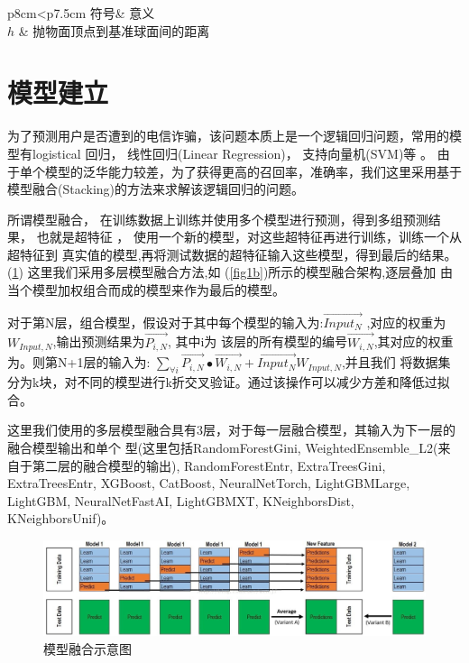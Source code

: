 \documentclass[withoutpreface,bwprint]{cumcmthesis} %
\begin{document}
        \begin{longtable}{p{8cm}<{\centering}p{7.5cm}}
            \toprule  %
            符号& 意义\\
            \midrule  %
            $h$ & 抛物面顶点到基准球面间的距离  \\
            \bottomrule %
        \end{longtable}

        \newpage


        \section{模型建立}

为了预测用户是否遭到的电信诈骗，该问题本质上是一个逻辑回归问题，常用的模型有logistical 回归，
线性回归(Linear Regression)， 支持向量机(SVM)等 。
由于单个模型的泛华能力较差，为了获得更高的召回率，准确率，我们这里采用基于
模型融合(Stacking)的方法来求解该逻辑回归的问题。

     所谓模型融合， 在训练数据上训练并使用多个模型进行预测，得到多组预测结果，
     也就是超特征 ，  使用一个新的模型，对这些超特征再进行训练，训练一个从超特征到
     真实值的模型,再将测试数据的超特征输入这些模型，得到最后的结果。   (\ref{fig1a})
     这里我们采用多层模型融合方法,如 (\ref{fig1b})所示的模型融合架构,逐层叠加
     由当个模型加权组合而成的模型来作为最后的模型。

    对于第N层，组合模型，假设对于其中每个模型的输入为:$\vec{Input_{N}}$ ,对应的权重为$W_{Input ,N}$,输出预测结果为$\vec{P_{i,N}}$, 其中i为
    该层的所有模型的编号$\vec{W_{i,N}}$,其对应的权重为。则第N+1层的输入为:
    $ \sum_{\forall i } \vec{P_{i,N}}\bullet \vec{W_{i,N}} +\vec{Input_{N}}W_{Input ,N} $,并且我们
    将数据集分为k块，对不同的模型进行k折交叉验证。通过该操作可以减少方差和降低过拟合。
  
   这里我们使用的多层模型融合具有3层，对于每一层融合模型，其输入为下一层的融合模型输出和单个
   型(这里包括RandomForestGini, WeightedEnsemble\_L2(来自于第二层的融合模型的输出), RandomForestEntr,
   ExtraTreesGini, ExtraTreesEntr, XGBoost, CatBoost,
   NeuralNetTorch, LightGBMLarge, LightGBM, NeuralNetFastAI,
   LightGBMXT, KNeighborsDist, KNeighborsUnif)。
    
     \begin{figure}[H]
        \begin{minipage}[t]{0.5\linewidth}
        
            \centering
            \includegraphics[scale=0.3]{images/moxing.png}
            \caption{模型融合示意图}
            \label{fig1a}
            \end{minipage}%
        \end{figure}
\end{document}
